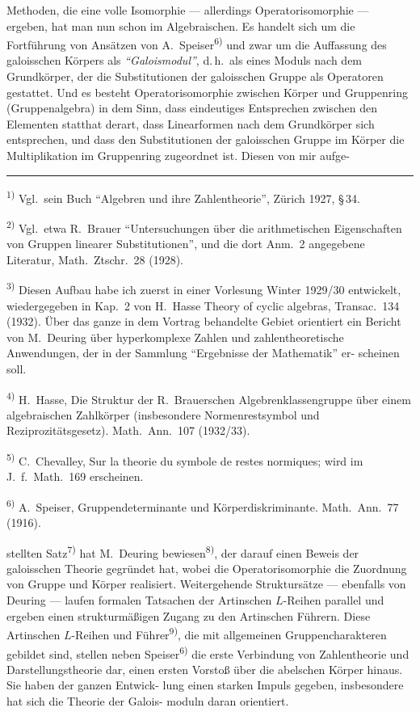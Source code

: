 \documentclass[12pt,a4paper]{article}
\theoremstyle{plain}
\begin{document}
Methoden, die eine volle Isomorphie --- allerdings Operatorisomorphie --- ergeben,
hat man nun schon im Algebraischen. Es handelt sich um die Fortf\"uhrung von
Ans\"atzen von A.~Speiser\textsuperscript{6)} und zwar um die Auffassung des galoisschen K\"orpers als
\emph{``Galoismodul''}, d.\,h.\ als eines Moduls nach dem Grundk\"orper, der die Substitutionen
der galoisschen Gruppe als Operatoren gestattet. Und es besteht Operatorisomorphie
zwischen K\"orper und Gruppenring (Gruppenalgebra) in dem Sinn, dass eindeutiges
Entsprechen zwischen den Elementen statthat derart, dass Linearformen nach dem
Grundk\"orper sich entsprechen, und dass den Substitutionen der galoisschen Gruppe
im K\"orper die Multiplikation im Gruppenring zugeordnet ist. Diesen von mir aufge-

\bigskip
\noindent\rule{0.3\textwidth}{0.4pt}

{\small
\textsuperscript{1)} Vgl.\ sein Buch ``Algebren und ihre Zahlentheorie'', Z\"urich 1927, \S\,34.

\textsuperscript{2)} Vgl.\ etwa R.~Brauer ``Untersuchungen \"uber die arithmetischen Eigenschaften
von Gruppen linearer Substitutionen'', und die dort Anm.~2 angegebene Literatur, Math.\ Ztschr.\ 28 (1928).

\textsuperscript{3)} Diesen Aufbau habe ich zuerst in einer Vorlesung Winter 1929/30 entwickelt, wiedergegeben in
Kap.~2 von H.~Hasse Theory of cyclic algebras, Transac.\ 134 (1932). \"Uber das ganze in dem
Vortrag behandelte Gebiet orientiert ein Bericht von M.~Deuring \"uber hyperkomplexe Zahlen
und zahlentheoretische Anwendungen, der in der Sammlung ``Ergebnisse der Mathematik'' er-
scheinen soll.

\textsuperscript{4)} H.~Hasse, Die Struktur der R.~Brauerschen Algebrenklassengruppe \"uber einem
algebraischen Zahlk\"orper (insbesondere Normenrestsymbol und Reziprozit\"atsgesetz). Math.\ Ann.\ 107 (1932/33).

\textsuperscript{5)} C.~Chevalley, Sur la theorie du symbole de restes normiques; wird im J.\ f.\ Math.\ 169
erscheinen.

\textsuperscript{6)} A.~Speiser, Gruppendeterminante und K\"orperdiskriminante. Math.\ Ann.\ 77 (1916).
}


\noindent
stellten Satz\textsuperscript{7)} hat M.~Deuring bewiesen\textsuperscript{8)}, der darauf einen Beweis der galoisschen
Theorie gegr\"undet hat, wobei die Operatorisomorphie die Zuordnung von Gruppe
und K\"orper realisiert. Weitergehende Strukturs\"atze --- ebenfalls von Deuring ---
laufen formalen Tatsachen der Artinschen $L$-Reihen parallel und ergeben einen
strukturm\"a\ss igen Zugang zu den Artinschen F\"uhrern. Diese Artinschen $L$-Reihen
und F\"uhrer\textsuperscript{9)}, die mit allgemeinen Gruppencharakteren gebildet sind, stellen neben
Speiser\textsuperscript{6)} die erste Verbindung von Zahlentheorie und Darstellungstheorie dar, einen
ersten Vorsto\ss{} \"uber die abelschen K\"orper hinaus. Sie haben der ganzen Entwick-
lung einen starken Impuls gegeben, insbesondere hat sich die Theorie der Galois-
moduln daran orientiert.
\end{document}
